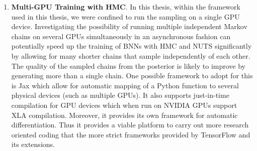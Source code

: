 \begin{enumerate}
    \item \textbf{Multi-GPU Training with HMC}. In this thesis, within the framework used in this thesis, we were confined to run the sampling on a single GPU device. Investigating the possibility of running multiple independent Markov chains on several GPUs simultaneously in an asynchronous fashion can potentially speed up the training of BNNs with HMC and NUTS significantly by allowing for many shorter chains that sample independently of each other. The quality of the sampled chains from the posterior is likely to improve by generating more than a single chain. One possible framework to adopt for this is Jax \cite{jax} which allow for automatic mapping of a Python function to several physical devices (such as multiple GPUs). It also supports just-in-time compilation for GPU devices which when run on NVIDIA GPUs support XLA compilation. Moreover, it provides its own framework for automatic differentiation. Thus it provides a viable platform to carry out more research oriented coding that the more strict frameworks provided by TensorFlow and its extensions.
\end{enumerate}